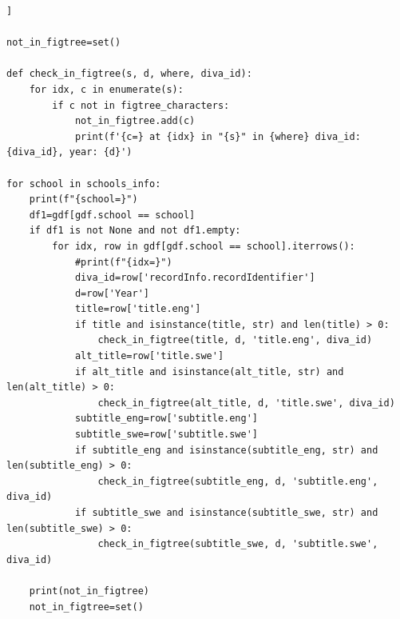\documentclass[12pt, twoside]{article}
\begin{document}
\begin{lstlisting}
]

not_in_figtree=set()

def check_in_figtree(s, d, where, diva_id):
    for idx, c in enumerate(s):
        if c not in figtree_characters:
            not_in_figtree.add(c)
            print(f'{c=} at {idx} in "{s}" in {where} diva_id: {diva_id}, year: {d}')

for school in schools_info:
    print(f"{school=}")
    df1=gdf[gdf.school == school]
    if df1 is not None and not df1.empty:
        for idx, row in gdf[gdf.school == school].iterrows():
            #print(f"{idx=}")
            diva_id=row['recordInfo.recordIdentifier']
            d=row['Year']
            title=row['title.eng']
            if title and isinstance(title, str) and len(title) > 0:
                check_in_figtree(title, d, 'title.eng', diva_id)
            alt_title=row['title.swe']
            if alt_title and isinstance(alt_title, str) and len(alt_title) > 0:
                check_in_figtree(alt_title, d, 'title.swe', diva_id)
            subtitle_eng=row['subtitle.eng']
            subtitle_swe=row['subtitle.swe']
            if subtitle_eng and isinstance(subtitle_eng, str) and len(subtitle_eng) > 0:
                check_in_figtree(subtitle_eng, d, 'subtitle.eng', diva_id)
            if subtitle_swe and isinstance(subtitle_swe, str) and len(subtitle_swe) > 0:
                check_in_figtree(subtitle_swe, d, 'subtitle.swe', diva_id)
            
    print(not_in_figtree)
    not_in_figtree=set()
 \end{lstlisting}


\end{document}
